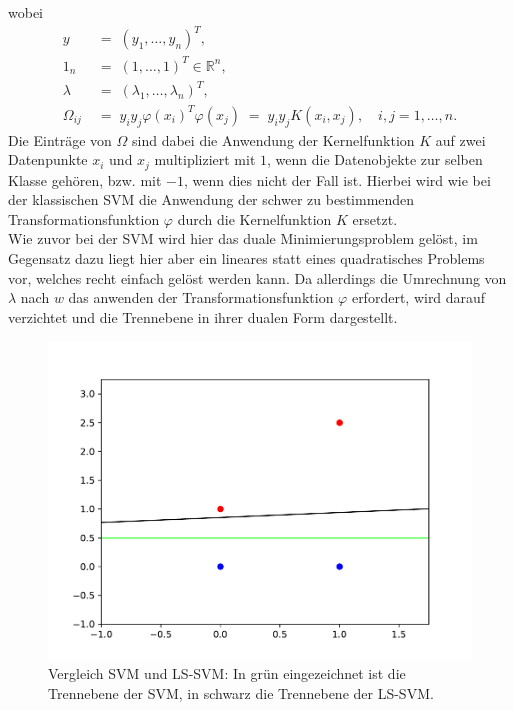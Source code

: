 wobei
\begin{align*}
	y &\;=\;(y_1,\dots,y_n)^T,\\
	1_n &\;=\;(1,\dots,1)^T\in\mathbb{R}^n,\\
	\lambda &\;=\;(\lambda_1,\dots,\lambda_n)^T,\\
	\Omega_{ij} &\;=\;y_iy_j\varphi(x_i)^T\varphi(x_j)\;=\;y_iy_jK(x_i,x_j), \quad i,j=1,\dots,n.
\end{align*}
Die Einträge von \(\Omega\) sind dabei die Anwendung der Kernelfunktion \(K\) auf zwei Datenpunkte \(x_i\) und \(x_j\) multipliziert mit \(1\), wenn die Datenobjekte zur selben Klasse gehören, bzw. mit \(-1\), wenn dies nicht der Fall ist. Hierbei wird wie bei der klassischen SVM die Anwendung der schwer zu bestimmenden Transformationsfunktion \(\varphi\) durch die  Kernelfunktion \(K\) ersetzt.\\
Wie zuvor bei der SVM wird hier das duale Minimierungsproblem gelöst, im Gegensatz dazu liegt hier aber ein lineares statt eines quadratisches Problems vor, welches recht einfach gelöst werden kann. Da allerdings die Umrechnung von \(\lambda\) nach \(w\) das anwenden der Transformationsfunktion \(\varphi\) erfordert, wird darauf verzichtet und die Trennebene in ihrer dualen Form dargestellt.\vspace*{-0,3cm}
\begin{figure}[h]
	\begin{center}	
	\includegraphics[scale=0.6]{SVMS.pdf}
	\end{center}
	\caption{Vergleich SVM und LS-SVM: In grün eingezeichnet ist die Trennebene der SVM, in schwarz die Trennebene der LS-SVM.}
	\label{fig:SVMS}
\end{figure}

